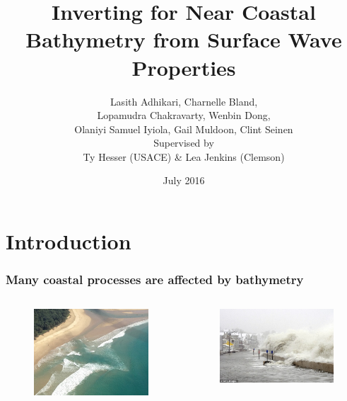 \documentclass[7pt]{beamer}
\title[Bathymetry Inversion from Waves]{Inverting for Near Coastal Bathymetry from Surface Wave Properties}
\author[]{ 
Lasith Adhikari, Charnelle Bland, \\
Lopamudra Chakravarty, Wenbin Dong, \\
Olaniyi Samuel Iyiola, Gail Muldoon, Clint Seinen \\
\vspace{5mm}
Supervised by\\ Ty  Hesser (USACE) \& Lea Jenkins (Clemson)}
\institute[IMSM]{Industrial Mathematical and Statistical Modeling Workshop}
\date{July 2016}
\begin{document}
\frame{\titlepage}

\section{Introduction}

\begin{frame}
    \frametitle{Many coastal processes are affected by bathymetry}
        \begin{columns}
                \begin{figure}[h!]
                		\includegraphics[width=1\linewidth]{img/Rip_C.jpg}\hfill
                \end{figure}              
                \begin{figure}
                		\includegraphics[width=1\linewidth]{img/C_Flood.jpg}\vfill

\end{figure}
\end{columns}
\end{frame}
\end{document}
